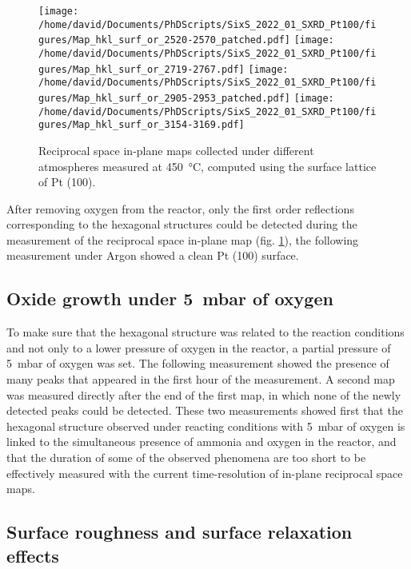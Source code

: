 \begin{figure}[!htb]
    \centering
    \texttt{[image: /home/david/Documents/PhDScripts/SixS\_2022\_01\_SXRD\_Pt100/figures/Map\_hkl\_surf\_or\_2520-2570\_patched.pdf]}
    \texttt{[image: /home/david/Documents/PhDScripts/SixS\_2022\_01\_SXRD\_Pt100/figures/Map\_hkl\_surf\_or\_2719-2767.pdf]}
    \texttt{[image: /home/david/Documents/PhDScripts/SixS\_2022\_01\_SXRD\_Pt100/figures/Map\_hkl\_surf\_or\_2905-2953\_patched.pdf]}
    \texttt{[image: /home/david/Documents/PhDScripts/SixS\_2022\_01\_SXRD\_Pt100/figures/Map\_hkl\_surf\_or\_3154-3169.pdf]}
    \caption{
        Reciprocal space in-plane maps collected under different atmospheres measured at \qty{450}{\degreeCelsius}, computed using the surface lattice of Pt (100).
    }
    \label{fig:MapsPt100C}
\end{figure}

After removing oxygen from the reactor, only the first order reflections corresponding to the hexagonal structures could be detected during the measurement of the reciprocal space in-plane map (fig. \ref{fig:MapsPt100C}), the following measurement under Argon showed a clean Pt (100) surface.

\subsection{Oxide growth under \qty{5}{\milli\bar} of oxygen}

To make sure that the hexagonal structure was related to the reaction conditions and not only to a lower pressure of oxygen in the reactor, a partial pressure of \qty{5}{\milli\bar} of oxygen was set.
The following measurement showed the presence of many peaks that appeared in the first hour of the measurement.
A second map was measured directly after the end of the first map, in which none of the newly detected peaks could be detected.
These two measurements showed first that the hexagonal structure observed under reacting conditions with \qty{5}{\milli\bar} of oxygen is linked to the simultaneous presence of ammonia and oxygen in the reactor, and that the duration of some of the observed phenomena are too short to be effectively measured with the current time-resolution of in-plane reciprocal space maps.

\subsection{Surface roughness and surface relaxation effects}


